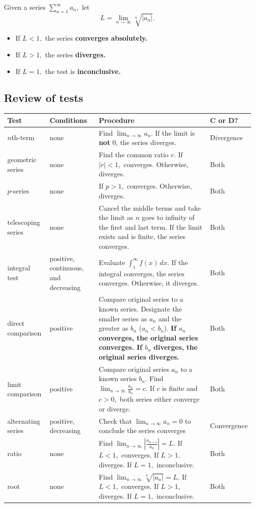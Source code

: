 \documentclass[letterpaper, 12pt]{article}
\begin{document}
Given a series $\displaystyle \sum_{n=1}^\infty a_n,$ let
$$L = \lim_{n \to \infty} \sqrt[n]{|a_n|}.$$
\begin{itemize}
    \item If $L < 1,$ the series \textbf{converges absolutely.}
    \item If $L > 1,$ the series \textbf{diverges.}
    \item If $L = 1,$ the test is \textbf{inconclusive.}
\end{itemize}

\newpage 

\subsection*{Review of tests}

\begin{table}[H]
\begin{tabular}{|p{6em}|p{8em}|p{20em}|p{6em}|}
\hline
\textbf{Test} & \textbf{Conditions} & \textbf{Procedure} & \textbf{C or D?} \\
\hline
$n$th-term & none & Find $\displaystyle \lim_{n \to \infty} a_n.$ If the limit is \textbf{not} 0, the series diverges.  & Divergence \\
\hline
geometric series & none & Find the common ratio $r.$ If $|r| < 1,$ converges. Otherwise, diverges. & Both \\
\hline
$p$-series & none & If $p > 1,$ converges. Otherwise, diverges. & Both \\
\hline
telescoping series & none & Cancel the middle terms and take the limit as $n$ goes to infinity of the first and last term. If the limit exists and is finite, the series converges. & Both \\
\hline
integral test & positive, continuous, and decreasing & Evaluate $ \int_1^\infty f(x) \, dx.$ If the integral converges, the series converges. Otherwise, it diverges. & Both \\
\hline
direct comparison & positive & Compare original series to a known series. Designate the smaller series as $a_n$ and the greater as $b_n$ ($a_n < b_n$). \textbf{If $a_n$ converges, the original series converges. If $b_n$ diverges, the original series diverges.} & Both \\
\hline
limit comparison & positive & Compare original series $a_n$ to a known series $b_n$. Find $\displaystyle \lim_{n \to \infty} \frac{a_n}{b_n} = c.$ If $c$ is finite and $c > 0,$ both series either converge or diverge. & Both \\
\hline
alternating series & positive, decreasing & Check that $\displaystyle \lim_{n \to \infty} a_n = 0$ to conclude the series converges & Convergence \\
\hline
ratio & none & Find $\displaystyle \lim_{n \to \infty} \left| \frac{a_{n+1}}{a_n} \right| = L.$ If $L < 1,$ converges. If $L > 1,$ diverges. If $L = 1,$ inconclusive. & Both \\
\hline
root & none & Find $\displaystyle \lim_{n \to \infty} \sqrt[n]{|a_n|} = L.$ If $L < 1,$ converges. If $L > 1,$ diverges. If $L = 1,$ inconclusive. & Both \\
\hline
\end{tabular}
\end{table}
\end{document}
